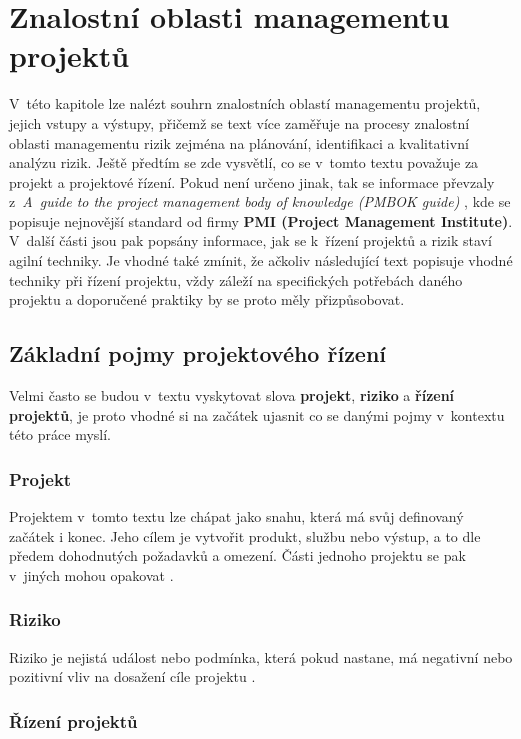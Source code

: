 \chapter{Znalostní oblasti managementu projektů}
\label{teorie}

V~této kapitole lze nalézt souhrn znalostních oblastí managementu projektů, jejich vstupy a výstupy, přičemž se text více zaměřuje na procesy znalostní oblasti managementu rizik zejména na plánování, identifikaci a kvalitativní analýzu rizik. Ještě předtím se zde vysvětlí, co se v~tomto textu považuje za projekt a projektové řízení. Pokud není určeno jinak, tak se informace převzaly z~\textit{A~guide to the project management body of knowledge (PMBOK guide)} \cite{PMBOK}, kde se popisuje nejnovější standard od firmy \textbf{PMI (Project Management Institute)}. V~další části jsou pak popsány informace, jak se k~řízení projektů a rizik staví agilní techniky. Je vhodné také zmínit, že ačkoliv následující text popisuje vhodné techniky při řízení projektu, vždy záleží na specifických potřebách daného projektu a doporučené praktiky by se proto měly přizpůsobovat.

\section{Základní pojmy projektového řízení}
Velmi často se budou v~textu vyskytovat slova \textbf{projekt}, \textbf{riziko} a \textbf{řízení projektů}, je proto vhodné si na začátek ujasnit co se danými pojmy v~kontextu této práce myslí. 

\subsection*{Projekt}

Projektem v~tomto textu lze chápat jako snahu, která má svůj definovaný začátek i konec. Jeho cílem je vytvořit produkt, službu nebo výstup, a to dle předem dohodnutých požadavků a omezení. Části jednoho projektu se pak v~jiných mohou opakovat \cite{ZaklPojmy}.

\subsection*{Riziko}

Riziko je nejistá událost nebo podmínka, která pokud nastane, má negativní nebo pozitivní vliv na dosažení cíle projektu \cite{ZaklPojmy}.

\subsection*{Řízení projektů}


